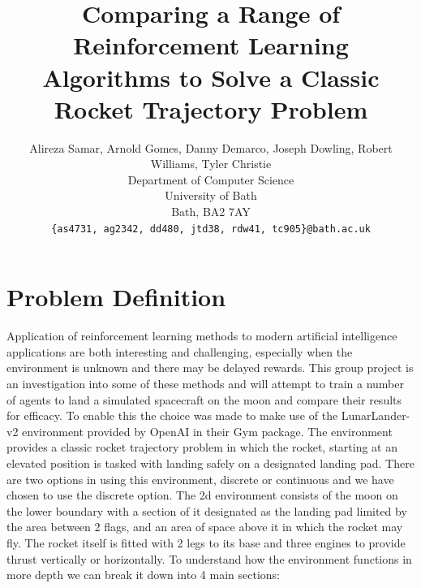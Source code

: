 \documentclass{article}
\title{Comparing a Range of Reinforcement Learning Algorithms to Solve a Classic Rocket Trajectory Problem}
\author{
  Alireza Samar, Arnold Gomes, Danny Demarco, Joseph Dowling, Robert Williams, Tyler Christie
  \\
  Department of Computer Science\\
  University of Bath\\
  Bath, BA2 7AY \\
  \texttt{\{as4731, ag2342, dd480, jtd38, rdw41, tc905\}@bath.ac.uk} \\
}
\begin{document}
\maketitle
\newpage
\tableofcontents
\listoffigures
\newpage

\section{Problem Definition}
Application of reinforcement learning methods to modern artificial intelligence applications are both interesting and challenging, especially when the environment is unknown and there may be delayed rewards. This group project is an investigation into some of these methods and will attempt to train a number of agents to land a simulated spacecraft on the moon and compare their results for efficacy. To enable this the choice was made to make use of the LunarLander-v2 environment provided by OpenAI in their Gym package. The environment provides a classic rocket trajectory problem in which the rocket, starting at an elevated position is tasked with landing safely on a designated landing pad. There are two options in using this environment, discrete or continuous and we have chosen to use the discrete option. The 2d environment consists of the moon on the lower boundary with a section of it designated as the landing pad limited by the area between 2 flags, and an area of space above it in which the rocket may fly. The rocket itself is fitted with 2 legs to its base and three engines to provide thrust vertically or horizontally. To understand how the environment functions in more depth we can break it down into 4 main sections:
\end{document}
